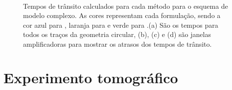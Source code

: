 \begin{figure}[H]
	\centering
	 \\
	 \hfill
	 \hfill
	\caption{Tempos de trânsito calculados para cada método para o esquema de modelo complexo. As cores representam cada formulação, sendo a cor azul para , laranja para  e verde para .(a) São  os tempos para todos os traços da geometria circular, (b), (c) e (d) são janelas amplificadoras para mostrar os atrasos dos tempos de trânsito.}
	\label{fig:result_overthrust}	
\end{figure}

\section{Experimento tomográfico}

